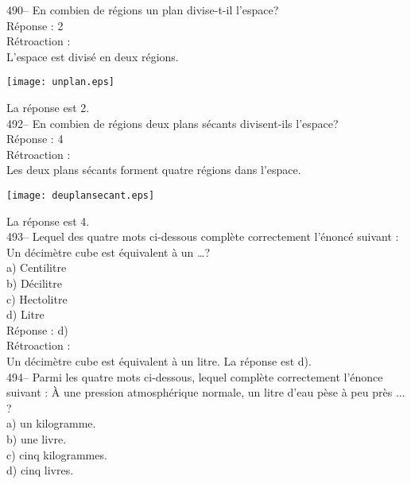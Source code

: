 ﻿\documentclass[letterpaper, 12pt]{article}
\begin{document}
490-- En combien de r\'egions un plan divise-t-il l'espace?\\

R\'eponse : 2\\

R\'etroaction : \\
L'espace est divis\'e en deux r\'egions.\\
    \begin{center}
    \texttt{[image: unplan.eps]}
    \end{center}

La r\'eponse est 2.\\


492-- En combien de r\'egions deux plans s\'ecants divisent-ils l'espace?\\

R\'eponse : 4\\

R\'etroaction :\\
Les deux plans s\'ecants forment quatre r\'egions dans l'espace.\\
    \begin{center}
    \texttt{[image: deuplansecant.eps]}
    \end{center}
La r\'eponse est 4.\\

493--  Lequel des quatre mots ci-dessous compl\`ete correctement
l'\'enonc\'e suivant : \og Un d\'ecim\`etre cube est \'equivalent
\`a un \ldots\fg ?\\
a) Centilitre\\
b) D\'ecilitre\\
c) Hectolitre\\
d) Litre\\

R\'eponse : d)\\

R\'etroaction : \\
Un d\'ecim\`etre cube est \'equivalent \`a un litre.  La r\'eponse est d).\\

494-- Parmi les quatre mots ci-dessous, lequel compl\`ete
correctement l'\'enonce suivant : \og\`A une pression
atmosph\'erique normale, un litre d'eau p\`ese \`a peu pr\`es $\ldots$\fg ?\\
a) un kilogramme.\\
b) une livre.\\
c) cinq kilogrammes.\\
d) cinq livres.\\
\end{document}
